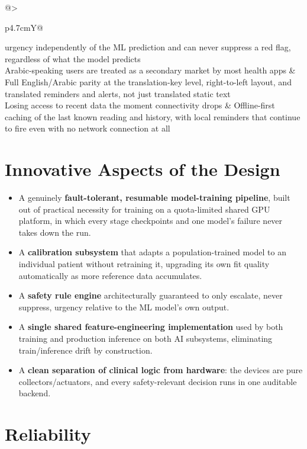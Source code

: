 \documentclass[12pt,a4paper]{report}
\begin{document}
\begin{table}[H]
\begin{tabularx}{\linewidth}{@{}>{\raggedright\arraybackslash}p{4.7cm}Y@{}}
urgency independently of the ML prediction and can never suppress a red flag,
regardless of what the model predicts \\
Arabic-speaking users are treated as a secondary market by most health apps &
Full English/Arabic parity at the translation-key level, right-to-left
layout, and translated reminders and alerts, not just translated static text \\
Losing access to recent data the moment connectivity drops &
Offline-first caching of the last known reading and history, with local
reminders that continue to fire even with no network connection at all \\
\bottomrule
\end{tabularx}
\end{table}

\section{Innovative Aspects of the Design}

\begin{itemize}[leftmargin=1.4em]
  \item A genuinely \textbf{fault-tolerant, resumable model-training pipeline},
  built out of practical necessity for training on a quota-limited shared GPU
  platform, in which every stage checkpoints and one model's failure never takes
  down the run.
  \item A \textbf{calibration subsystem} that adapts a population-trained model
  to an individual patient without retraining it, upgrading its own fit quality
  automatically as more reference data accumulates.
  \item A \textbf{safety rule engine} architecturally guaranteed to only
  escalate, never suppress, urgency relative to the ML model's own output.
  \item A \textbf{single shared feature-engineering implementation} used by both
  training and production inference on both AI subsystems, eliminating
  train/inference drift by construction.
  \item A \textbf{clean separation of clinical logic from hardware}: the devices
  are pure collectors/actuators, and every safety-relevant decision runs in one
  auditable backend.
\end{itemize}

\section{Reliability}
\end{document}
